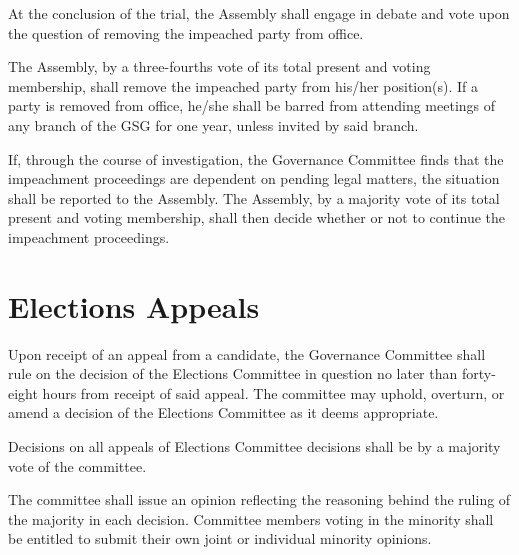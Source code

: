 \begin{bylaws-number}
\begin{bylaws-number}
    \item At the conclusion of the trial, the Assembly shall engage in debate and vote upon the question of removing the impeached party from office.
    \item The Assembly, by a three-fourths vote of its total present and voting membership, shall remove the impeached party from his/her position(s). If a party is removed from office, he/she shall be barred from attending meetings of any branch of the GSG for one year, unless invited by said branch.
  \end{bylaws-number}
  \item If, through the course of investigation, the Governance Committee finds that the impeachment proceedings are dependent on pending legal matters, the situation shall be reported to the Assembly. The Assembly, by a majority vote of its total present and voting membership, shall then decide whether or not to continue the impeachment proceedings.
\end{bylaws-number}

\section{Elections Appeals}
\begin{bylaws-number}
  \item Upon receipt of an appeal from a candidate, the Governance Committee shall rule on the decision of the Elections Committee in question no later than forty-eight hours from receipt of said appeal. The committee may uphold, overturn, or amend a decision of the Elections Committee as it deems appropriate.
  \item Decisions on all appeals of Elections Committee decisions shall be by a majority vote of the committee.
  \item The committee shall issue an opinion reflecting the reasoning behind the ruling of the majority in each decision. Committee members voting in the minority shall be entitled to submit their own joint or individual minority opinions.
\end{bylaws-number}